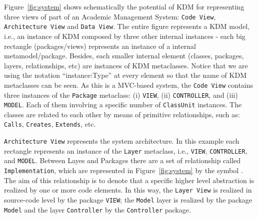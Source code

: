 Figure~\ref{fig:system} shows schematically the potential of KDM for representing three views of part of an Academic Management System: \texttt{Code View}, \texttt{Architecture View} and \texttt{Data View}. The entire figure represents a KDM model, i.e., an instance of KDM composed by three other internal instances - each big rectangle (packages/views) represents an instance of a internal metamodel/package. Besides, each smaller internal element (classes, packages, layers, relationships, etc) are instances of KDM metaclasses. Notice that we are using the notation ``instance:Type'' at every element so that the name of KDM metaclasses can be seen.
As this is a MVC-based system, the \texttt{Code View} contains three instances of the \texttt{Package} metaclass: (i) \texttt{VIEW}, (ii) \texttt{CONTROLLER}, and (iii) \texttt{MODEL}. Each of them involving a specific number of \texttt{ClassUnit} instances. The classes are related to each other by means of primitive relationships, such as: \texttt{Calls}, \texttt{Creates}, \texttt{Extends}, etc.

\texttt{Architecture View} represents the system architecture. In this example each rectangle represents an instance of the \texttt{Layer} metaclass, i.e., \texttt{VIEW}, \texttt{CONTROLLER}, and \texttt{MODEL}. Between Layes and Packages there are a set of relationship called \texttt{Implementation}, which are represented in Figure~\ref{fig:system} by the symbol \foobarMeu. The aim of this relationship is to denote that a specific higher level abstraction is realized by one or more code elements. In this way, the \texttt{Layer View} is realized in source-code level by the package \texttt{VIEW}; the \texttt{Model} layer is realized by the package \texttt{Model} and the layer \texttt{Controller} by the \texttt{Controller} package.



